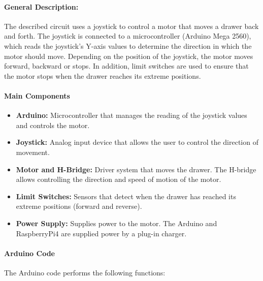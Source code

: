     \paragraph{\textbf{General Description:}}
    
    
    The described circuit uses a joystick to control a motor that moves a drawer back and forth. The joystick is connected to a microcontroller (Arduino Mega 2560), which reads the joystick's Y-axis values to determine the direction in which the motor should move. Depending on the position of the joystick, the motor moves forward, backward or stops. In addition, limit switches are used to ensure that the motor stops when the drawer reaches its extreme positions.
    
    
    
    \paragraph{\textbf{Main Components}
    }
    \begin{itemize}
        \item \textbf{Arduino:} Microcontroller that manages the reading of the joystick values and controls the motor.
        \item \textbf{Joystick:} Analog input device that allows the user to control the direction of movement.
        \item \textbf{Motor and H-Bridge:} Driver system that moves the drawer. The H-bridge allows controlling the direction and speed of motion of the motor.
        \item \textbf{Limit Switches:} Sensors that detect when the drawer has reached its extreme positions (forward and reverse).
        \item \textbf{Power Supply:} Supplies power to the motor. The Arduino and RaspberryPi4 are supplied power by a plug-in charger.
    \end{itemize}
    
    
    \paragraph{\textbf{Arduino Code}
    }
    
    The Arduino code performs the following functions:
    
